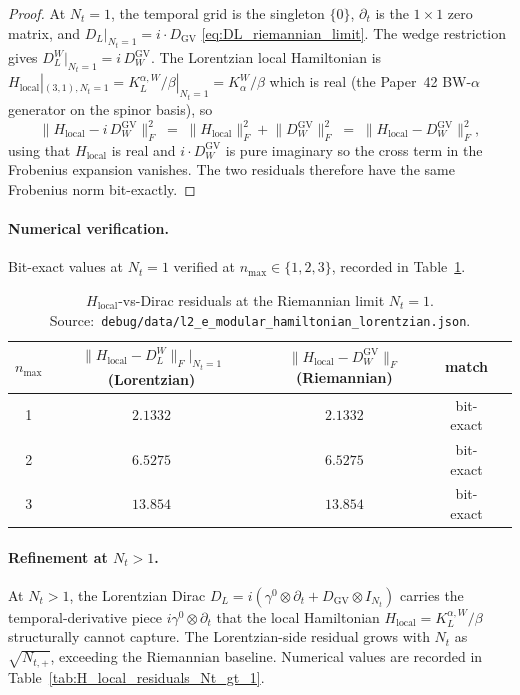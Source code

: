 \documentclass[11pt,a4paper]{article}
\theoremstyle{plain}
\theoremstyle{definition}
\newcommand{\nmax}{n_{\max}}
\newcommand{\Nt}{N_t}
\newcommand{\Frob}[1]{\lVert #1 \rVert_{F}}
\newcommand{\DGV}{D_{\mathrm{GV}}}
\newcommand{\DL}{D_{L}}
\newcommand{\KL}{K_{L}}
\begin{document}
\begin{proof}
At $\Nt = 1$, the temporal grid is the singleton $\{0\}$, $\partial_t$
is the $1 \times 1$ zero matrix, and
$\DL|_{\Nt = 1} = i \cdot \DGV$
\eqref{eq:DL_riemannian_limit}. The wedge restriction gives
$\DL^W|_{\Nt = 1} = i\, D_W^{\mathrm{GV}}$. The Lorentzian local
Hamiltonian is $H_{\mathrm{local}}|_{(3, 1), \Nt = 1} = \KL^{\alpha, W}/\beta|_{\Nt = 1} =
K_\alpha^W / \beta$ which is real (the Paper~42 BW-$\alpha$ generator
on the spinor basis), so
\[
   \Frob{H_{\mathrm{local}} - i\, D_W^{\mathrm{GV}}}^2
   \;=\; \Frob{H_{\mathrm{local}}}^2 + \Frob{D_W^{\mathrm{GV}}}^2
   \;=\; \Frob{H_{\mathrm{local}} - D_W^{\mathrm{GV}}}^2,
\]
using that $H_{\mathrm{local}}$ is real and $i \cdot D_W^{\mathrm{GV}}$ is
pure imaginary so the cross term in the Frobenius expansion vanishes.
The two residuals therefore have the same Frobenius norm bit-exactly.
\end{proof}

\paragraph{Numerical verification.}
Bit-exact values at $\Nt = 1$ verified at $\nmax \in \{1, 2, 3\}$,
recorded in Table~\ref{tab:H_local_residuals}.

\begin{table}[ht]
\centering
\caption{$H_{\mathrm{local}}$-vs-Dirac residuals at the Riemannian
limit $\Nt = 1$. Source:\
\texttt{debug/data/l2\_e\_modular\_hamiltonian\_lorentzian.json}.}
\label{tab:H_local_residuals}
\begin{tabular}{ccccc}
\toprule
$\nmax$ & $\Frob{H_{\mathrm{local}} - \DL^W}|_{\Nt = 1}$ (Lorentzian) &
$\Frob{H_{\mathrm{local}} - D_W^{\mathrm{GV}}}$ (Riemannian) & match\\
\midrule
1 & $2.1332$  & $2.1332$  & bit-exact \\
2 & $6.5275$  & $6.5275$  & bit-exact \\
3 & $13.854$  & $13.854$  & bit-exact \\
\bottomrule
\end{tabular}
\end{table}

\paragraph{Refinement at $\Nt > 1$.}
At $\Nt > 1$, the Lorentzian Dirac $\DL = i (\gamma^0 \otimes \partial_t
+ \DGV \otimes I_{\Nt})$ carries the temporal-derivative piece
$i \gamma^0 \otimes \partial_t$ that the local Hamiltonian
$H_{\mathrm{local}} = \KL^{\alpha, W}/\beta$ structurally cannot capture.
The Lorentzian-side residual grows with $\Nt$ as $\sqrt{N_{t, +}}$,
exceeding the Riemannian baseline. Numerical values are recorded in
Table~\ref{tab:H_local_residuals_Nt_gt_1}.
\end{document}
